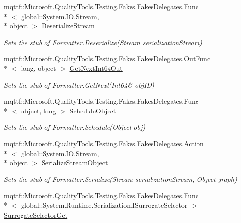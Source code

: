 \begin{DoxyCompactItemize}
mqttf\-::\-Microsoft.\-Quality\-Tools.\-Testing.\-Fakes.\-Fakes\-Delegates.\-Func\\*
$<$ global\-::\-System.\-I\-O.\-Stream, \\*
object $>$ \hyperlink{class_system_1_1_runtime_1_1_serialization_1_1_fakes_1_1_stub_formatter_a1029aa68de234625cf7987eddc1097c7}{Deserialize\-Stream}
\begin{DoxyCompactList}\small\item\em Sets the stub of Formatter.\-Deserialize(\-Stream serialization\-Stream)\end{DoxyCompactList}\item 
mqttf\-::\-Microsoft.\-Quality\-Tools.\-Testing.\-Fakes.\-Fakes\-Delegates.\-Out\-Func\\*
$<$ long, object $>$ \hyperlink{class_system_1_1_runtime_1_1_serialization_1_1_fakes_1_1_stub_formatter_a8cbd900aacf966310ba11000f7c84ecc}{Get\-Next\-Int64\-Out}
\begin{DoxyCompactList}\small\item\em Sets the stub of Formatter.\-Get\-Next(Int64\& obj\-I\-D)\end{DoxyCompactList}\item 
mqttf\-::\-Microsoft.\-Quality\-Tools.\-Testing.\-Fakes.\-Fakes\-Delegates.\-Func\\*
$<$ object, long $>$ \hyperlink{class_system_1_1_runtime_1_1_serialization_1_1_fakes_1_1_stub_formatter_a16a2db7f3a043cc1d52ce7c741155f8e}{Schedule\-Object}
\begin{DoxyCompactList}\small\item\em Sets the stub of Formatter.\-Schedule(\-Object obj)\end{DoxyCompactList}\item 
mqttf\-::\-Microsoft.\-Quality\-Tools.\-Testing.\-Fakes.\-Fakes\-Delegates.\-Action\\*
$<$ global\-::\-System.\-I\-O.\-Stream, \\*
object $>$ \hyperlink{class_system_1_1_runtime_1_1_serialization_1_1_fakes_1_1_stub_formatter_a8d8c7edc9f967890dad00f50c766bc1a}{Serialize\-Stream\-Object}
\begin{DoxyCompactList}\small\item\em Sets the stub of Formatter.\-Serialize(\-Stream serialization\-Stream, Object graph)\end{DoxyCompactList}\item 
mqttf\-::\-Microsoft.\-Quality\-Tools.\-Testing.\-Fakes.\-Fakes\-Delegates.\-Func\\*
$<$ global\-::\-System.\-Runtime.\-Serialization.\-I\-Surrogate\-Selector $>$ \hyperlink{class_system_1_1_runtime_1_1_serialization_1_1_fakes_1_1_stub_formatter_adf271fea026cd86c67cd83ef2d343ee1}{Surrogate\-Selector\-Get}

\end{DoxyCompactItemize}
